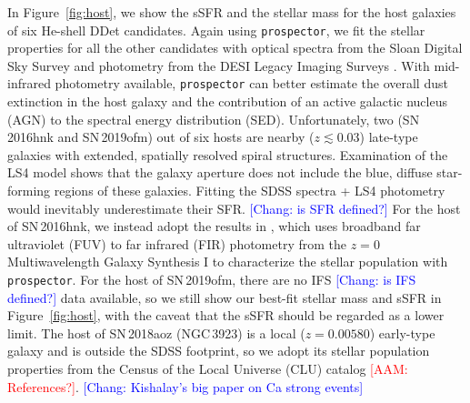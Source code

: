 \documentclass[twocolumn]{aastex631}
\newcommand{\adam}[1]{\textcolor{red}{[AAM: #1]}}
\newcommand{\chang}[1]{\textcolor{blue}{[Chang: #1]}}
\begin{document}
In Figure~\ref{fig:host}, we show the sSFR and the stellar mass for the host galaxies of six He-shell DDet candidates. Again using \texttt{prospector}, we fit the stellar properties for all the other candidates with optical spectra from the Sloan Digital Sky Survey \citep[SDSS;][]{York_2000} and photometry from the DESI Legacy Imaging Surveys \citep[][{\it g, r, z, $W_1$, $W_2$, $W_3$, $W_4$} magnitudes]{Dey_2019}. With mid-infrared photometry available, \texttt{prospector} can better estimate the overall dust extinction in the host galaxy and the contribution of an active galactic nucleus (AGN) to the spectral energy distribution (SED). Unfortunately, two (SN\,2016hnk and SN\,2019ofm) out of six hosts are nearby ($z\lesssim 0.03$) late-type galaxies with extended, spatially resolved spiral structures. Examination of the LS4 model shows that the galaxy aperture does not include the blue, diffuse star-forming regions of these galaxies. Fitting the SDSS spectra + LS4 photometry would inevitably underestimate their SFR. \chang{is SFR defined?} For the host of SN\,2016hnk, 
we instead adopt the results in \citet{Dong_Ca-rich_2022}, which uses broadband  far ultraviolet (FUV) to far infrared (FIR) photometry from the $z=0$ Multiwavelength Galaxy Synthesis I \citep[z0MGS;][]{Leroy_2019} to characterize the stellar population with \texttt{prospector}. For the host of SN\,2019ofm, there are no IFS \chang{is IFS defined?} data available, so we still show our best-fit stellar mass and sSFR in Figure~\ref{fig:host}, with the caveat that the sSFR should be regarded as a lower limit. The host of SN\,2018aoz (NGC\,3923) is a local ($z=0.00580$) early-type galaxy and is outside the SDSS footprint, so we adopt its stellar population properties from the Census of the Local Universe (CLU) catalog \adam{References?}. \chang{Kishalay's big paper on Ca strong events}
\end{document}
